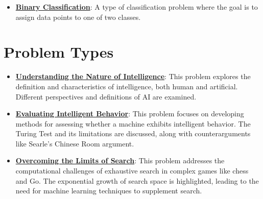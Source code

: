 \documentclass{article}%
\begin{document}
\begin{itemize}[leftmargin=*]
\item \href{\url{https://purdue.brightspace.com/d2l/common/assets/pdfjs-d2l-dist/1.0.14-legacy/web/viewer.html?file=\%252Fcontent\%252Fenforced\%252F1095467-wl.202510.CS.24300.001\%252F05L2-ML\%20Basics.pdf\%253Fou\%253D1095467\&lang=en-us\&container=d2l-fileviewer-rendered-pdf\&fullscreen=d2l-fileviewer-rendered-pdf-dialog\&height=667}#page=20}{\textbf{Binary Classification}}: A type of classification problem where the goal is to assign data points to one of two classes.%
\end{itemize}

%
\section{Problem Types}%
\label{sec:ProblemTypes}%
\begin{itemize}[leftmargin=*]%
\item \href{\url{https://purdue.brightspace.com/d2l/common/assets/pdfjs-d2l-dist/1.0.14-legacy/web/viewer.html?file=\%252Fcontent\%252Fenforced\%252F1095467-wl.202510.CS.24300.001\%252F02L2-Intro.pdf\%253Fou\%253D1095467\&lang=en-us\&container=d2l-fileviewer-rendered-pdf\&fullscreen=d2l-fileviewer-rendered-pdf-dialog\&height=667}#page=5}{\textbf{Understanding the Nature of Intelligence}}: This problem explores the definition and characteristics of intelligence, both human and artificial. Different perspectives and definitions of AI are examined.%
\item \href{\url{https://purdue.brightspace.com/d2l/common/assets/pdfjs-d2l-dist/1.0.14-legacy/web/viewer.html?file=\%252Fcontent\%252Fenforced\%252F1095467-wl.202510.CS.24300.001\%252F02L2-Intro.pdf\%253Fou\%253D1095467\&lang=en-us\&container=d2l-fileviewer-rendered-pdf\&fullscreen=d2l-fileviewer-rendered-pdf-dialog\&height=667}#page=6}{\textbf{Evaluating Intelligent Behavior}}: This problem focuses on developing methods for assessing whether a machine exhibits intelligent behavior. The Turing Test and its limitations are discussed, along with counterarguments like Searle's Chinese Room argument.%
\item \href{\url{https://purdue.brightspace.com/d2l/common/assets/pdfjs-d2l-dist/1.0.14-legacy/web/viewer.html?file=\%252Fcontent\%252Fenforced\%252F1095467-wl.202510.CS.24300.001\%252F02L2-Intro.pdf\%253Fou\%253D1095467\&lang=en-us\&container=d2l-fileviewer-rendered-pdf\&fullscreen=d2l-fileviewer-rendered-pdf-dialog\&height=667}#page=11}{\textbf{Overcoming the Limits of Search}}: This problem addresses the computational challenges of exhaustive search in complex games like chess and Go. The exponential growth of search space is highlighted, leading to the need for machine learning techniques to supplement search.%

\end{itemize}
\end{document}
